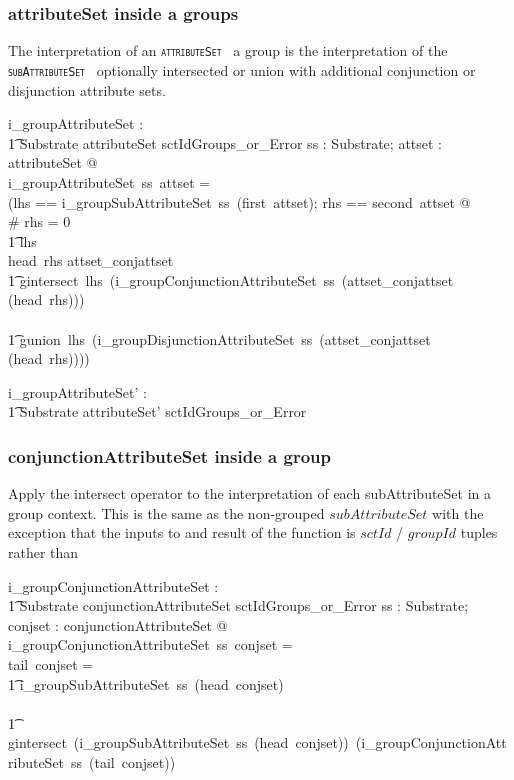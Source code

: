 \documentclass{article}
\def\spec#1{{\tt \small \textsc{{#1}} }}
\begin{document}
\subsubsection{attributeSet inside a groups}
The interpretation of an \spec{attributeSet} a group is the interpretation of the \spec{subAttributeSet}
optionally intersected or union with additional conjunction or disjunction attribute sets.


\begin{gendef}
   i\_groupAttributeSet : \\
\t1 Substrate \fun attributeSet \fun sctIdGroups\_or\_Error
\where
   \forall ss : Substrate; attset : attributeSet @ \\
   i\_groupAttributeSet~ss~attset = \\
   (\LET lhs == i\_groupSubAttributeSet~ss~(first~attset); rhs == second~attset @ \\
 \IF \# rhs = 0 \THEN \\
 \t1 lhs \\
 \ELSE \IF head~rhs \in \ran attset\_conjattset \THEN \\
 \t1 gintersect~lhs~(i\_groupConjunctionAttributeSet~ss~(attset\_conjattset \inv (head~rhs))) \\
  \ELSE \\
  \t1 gunion~lhs~(i\_groupDisjunctionAttributeSet~ss~(attset\_conjattset \inv (head~rhs))))
\end{gendef}
\begin{gendef}
   i\_groupAttributeSet' : \\
\t1 Substrate \fun attributeSet' \fun sctIdGroups\_or\_Error
\end{gendef}

\subsubsection{conjunctionAttributeSet inside a group}
Apply the intersect operator to the interpretation of each  subAttributeSet in a group context. This is the same as the non-grouped $subAttributeSet$ with the exception that the inputs to and result of the function is $sctId$ / $groupId$ tuples rather than



\begin{gendef}
    i\_groupConjunctionAttributeSet : \\
\t1 Substrate \fun conjunctionAttributeSet \fun sctIdGroups\_or\_Error
\where
   \forall ss : Substrate;  conjset : conjunctionAttributeSet @ \\
   i\_groupConjunctionAttributeSet~ss~conjset = ~ \\
   \IF tail~conjset = \langle \rangle \THEN \\
   \t1 i\_groupSubAttributeSet~ss~(head~conjset) \\
\ELSE \\
\t1 gintersect~(i\_groupSubAttributeSet~ss~(head~conjset))~(i\_groupConjunctionAttributeSet~ss~(tail~conjset))
\end{gendef}
\end{document}
